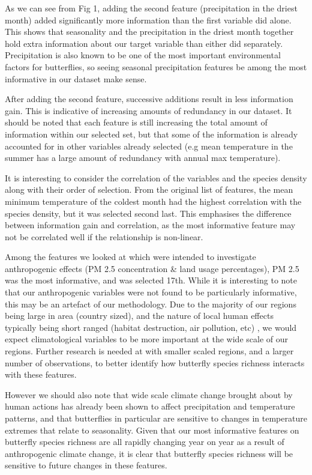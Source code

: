 \documentclass[prl,showpacs,superscriptaddress,twocolumn,longbibliography]{revtex4-1}
\begin{document}
As we can see from Fig 1, adding the second feature (precipitation in the driest month) added significantly more information than the first variable did alone. This shows that seasonality and the precipitation in the driest month together hold extra information about our target variable than either did separately. Precipitation is also known to be one of the most important environmental factors for butterflies\cite{rueda-m_environmental_2021}, so seeing seasonal precipitation features be among the most informative in our dataset make sense.

After adding the second feature, successive additions result in less information gain. This is indicative of increasing amounts of redundancy in our dataset. It should be noted that each feature is still increasing the total amount of information within our selected set, but that some of the information is already accounted for in other variables already selected (e.g mean temperature in the summer has a large amount of redundancy with annual max temperature).

It is interesting to consider the correlation of the variables and the species density along with their order of selection. From the original list of features, the mean minimum temperature of the coldest month had the highest correlation with the species density, but it was selected second last. This emphasises the difference between information gain and correlation, as the most informative feature may not be correlated well if the relationship is non-linear.

Among the features we looked at which were intended to investigate anthropogenic effects (PM 2.5 concentration \& land usage percentages), PM 2.5 was the most informative, and was selected 17th. While it is interesting to note that our anthropogenic variables were not found to be particularly informative, this may be an artefact of our methodology. Due to the majority of our regions being large in area (country sized), and the nature of local human effects typically being short ranged (habitat destruction, air pollution, etc) \cite{he_urban_2014}, we would expect climatological variables to be more important at the wide scale of our regions. Further research is needed at with smaller scaled regions, and a larger number of observations, to better identify how butterfly species richness interacts with these features. 

However we should also note that wide scale climate change brought about by human actions has already been shown to affect precipitation and temperature patterns\cite{trenberth_changes_2011, ashton_effects_2009}, and that butterflies in particular are sensitive to changes in temperature extremes that relate to seasonality\cite{bauerfeind_simulating_2014}. Given that our most informative features on butterfly species richness are all rapidly changing year on year as a result of anthropogenic climate change\cite{loarie_velocity_2009}, it is clear that butterfly species richness will be sensitive to future changes in these features. 
\end{document}
